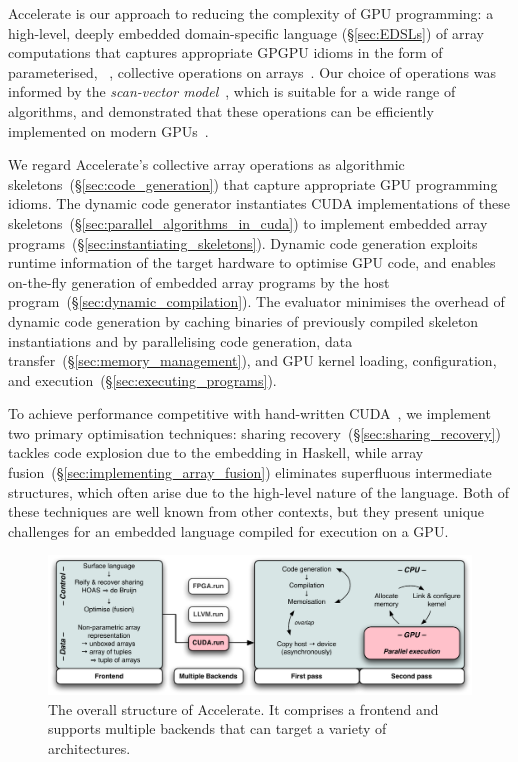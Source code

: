 Accelerate is our approach to reducing the complexity of GPU programming: a
high-level, deeply embedded domain-specific language (\S\ref{sec:EDSLs}) of
array computations that captures appropriate GPGPU idioms in the form of
parameterised, ~\cite{Keller:2010er}, collective
operations on arrays~\cite{Chakravarty:2011fr}. Our choice of operations was
informed by the \emph{scan-vector model}~\cite{Chatterjee:1990vj}, which is
suitable for a wide range of algorithms, and demonstrated that these operations
can be efficiently implemented on modern GPUs~\cite{Sengupta:2007tc}.

We regard Accelerate's collective array operations as algorithmic
skeletons~(\S\ref{sec:code_generation}) that capture appropriate GPU programming
idioms. The dynamic code generator instantiates CUDA implementations of these
skeletons~(\S\ref{sec:parallel_algorithms_in_cuda}) to implement embedded array
programs~(\S\ref{sec:instantiating_skeletons}). Dynamic code generation exploits
runtime information of the target hardware to optimise GPU code, and enables
on-the-fly generation of embedded array programs by the host
program~(\S\ref{sec:dynamic_compilation}). The evaluator minimises the overhead
of dynamic code generation by caching binaries of previously compiled skeleton
instantiations and by parallelising code generation, data
transfer~(\S\ref{sec:memory_management}), and GPU kernel loading, configuration,
and execution~(\S\ref{sec:executing_programs}).

To achieve performance competitive with hand-written
CUDA~\cite{McDonell:2013wi}, we implement two primary optimisation techniques:
sharing recovery~(\S\ref{sec:sharing_recovery}) tackles code explosion due to
the embedding in Haskell, while array
fusion~(\S\ref{sec:implementing_array_fusion}) eliminates superfluous
intermediate structures, which often arise due to the high-level nature of the
language. Both of these techniques are well known from other contexts, but they
present unique challenges for an embedded language compiled for execution on a
GPU.

\begin{figure}
    \centering
    \includegraphics[width=\textwidth]{images/sec-3/outline-s}
    \caption[The overall structure of Accelerate]{The overall structure of
    Accelerate. It comprises a frontend and supports multiple backends that can
    target a variety of architectures.}
    \label{fig:outline}
\end{figure}

